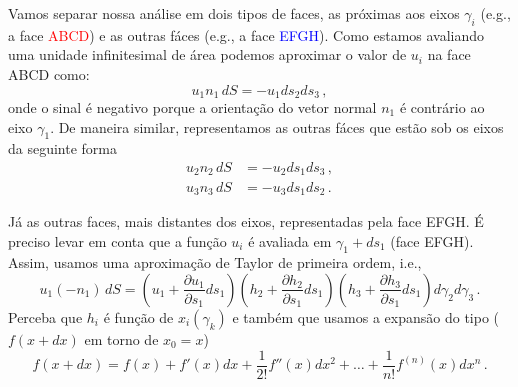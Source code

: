 Vamos separar nossa an\'alise em dois tipos de faces, as pr\'oximas aos eixos
$\gamma_{i}$ (e.g., a face \textcolor{red}{ABCD}) e as outras f\'aces (e.g., a
face \textcolor{blue}{EFGH}).
Como estamos avaliando uma unidade infinitesimal de \'area podemos aproximar o valor de
$u_i$ na face ABCD como:
\begin{equation}
u_1n_1\,dS=-u_{1}ds_{2}ds_{3}\, ,
\end{equation}
onde o sinal \'e negativo porque a orienta\c{c}\~ao do vetor normal $n_1$ \'e
contr\'ario ao eixo $\gamma_1$. De maneira similar, representamos as outras
f\'aces que est\~ao sob os eixos da seguinte forma
\begin{align}
  u_2n_2\,dS&=-u_{2}ds_{1}ds_{3}\, , \\
  u_3n_3\,dS&=-u_{3}ds_{1}ds_{2}\, .
\end{align}

J\'a as outras faces, mais distantes dos eixos, representadas pela face EFGH.
\'E preciso levar em conta que a fun\c{c}\~ao $u_i$ \'e avaliada em
$\gamma_1+ds_1$  (face EFGH). Assim, usamos uma aproxima\c{c}\~ao
de Taylor de primeira ordem, i.e.,
\begin{equation}
  u_1(-n_1)\,dS = \left(u_1 + \frac{\partial u_1}{\partial s_1}ds_1\right)
  \left(h_2 + \frac{\partial h_2}{\partial s_1}ds_1\right)
  \left(h_3 + \frac{\partial h_3}{\partial
  s_1}ds_1\right)d\gamma_2d\gamma_3\, .
  \label{eq:taylorface}
\end{equation}
Perceba que $h_i$ \'e fun\c{c}\~ao de $x_i(\gamma_k)$ e tamb\'em que usamos a expans\~ao do tipo
($f(x+dx)$ em torno de $x_0 = x$)
\begin{equation}
  f(x+dx) = f(x) + f'(x)dx + \frac{1}{2!}f''(x)dx^2 + \dots
  +\frac{1}{n!}f^{(n)}(x)dx^n \, .
\end{equation}

